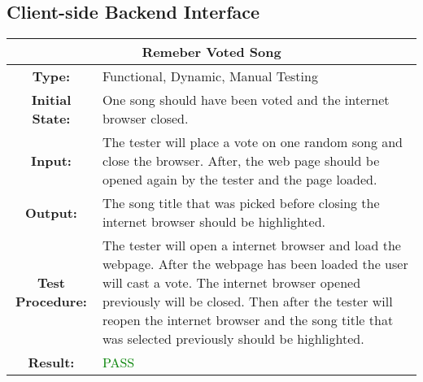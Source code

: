 \documentclass[12pt, titlepage]{article}
\begin{document}
\subsection{Client-side Backend Interface}


\begin{center}
\begin{table}[H]
\begin{tabularx}{\textwidth}{| c X |}
\hline
\multicolumn{2}{|c|}{\textbf{Remeber Voted Song}}\\
\hline
\textbf{Type: } & Functional, Dynamic, Manual Testing\\


\textbf{Initial State: } & One song should have been voted and the internet browser closed.\\


\textbf{Input: } & The tester will place a vote on one random song and close the browser. After, the web page should be opened again by the tester and the page loaded.\\


\textbf{Output: } & The song title that was picked before closing the internet browser should be highlighted.\\


\textbf{Test Procedure: } & The tester will open a internet browser and load the webpage. After the webpage has been loaded the user will cast a vote. The internet browser opened previously will be closed. Then after the tester will reopen the internet browser and the song title that was selected previously should be highlighted.\\


\textbf{Result: } & \textcolor{green}{PASS}\\
\hline
\end{tabularx}
\end{table}
\end{center}
\end{document}
